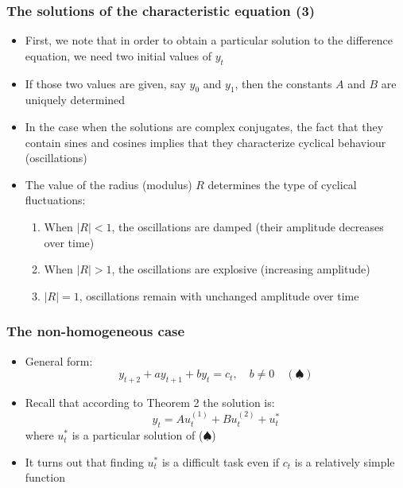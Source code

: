 \documentclass[10pt,usenames,dvipsnames]{beamer}
\theoremstyle{plain}
\theoremstyle{definition}
\begin{document}
\begin{frame}[fragile]
\frametitle{The solutions of the characteristic equation (3)}
\begin{itemize}
	\item First, we note that in order to obtain a particular solution to the difference equation, we need two initial values of $y_{t}$
	\item If those two values are given, say $y_{0}$ and $y_{1}$, then the constants $A$ and $B$ are uniquely determined
	\item In the case when the solutions are complex conjugates, the fact that they contain sines and cosines implies that they characterize cyclical behaviour (oscillations)
	\item The value of the radius (modulus) $R$ determines the type of cyclical fluctuations:
	\begin{enumerate}
		\item When $|R| < 1$, the oscillations are damped (their amplitude decreases over time)
		\item When $|R| > 1$, the oscillations are explosive (increasing amplitude)
		\item $|R| = 1$, oscillations remain with unchanged amplitude over time
	\end{enumerate}
\end{itemize}
\end{frame}

\begin{frame}[fragile]
\frametitle{The non-homogeneous case}
\begin{itemize}
	\item General form:
	\[
		y_{t+2} + a y_{t+1} + b y_{t} = c_{t}, \quad b \neq 0 \quad (\spadesuit)
	\]
	\item Recall that according to Theorem 2 the solution is:
	\[
		y_{t} = Au_{t}^{(1)} + Bu_{t}^{(2)} + u_{t}^{*}
	\]
	where $u_{t}^{*}$ is a particular solution of ($\spadesuit$)
	\item It turns out that finding $u_{t}^{*}$ is a difficult task even if $c_{t}$ is a relatively simple function
\end{itemize}
\end{frame}
\end{document}

